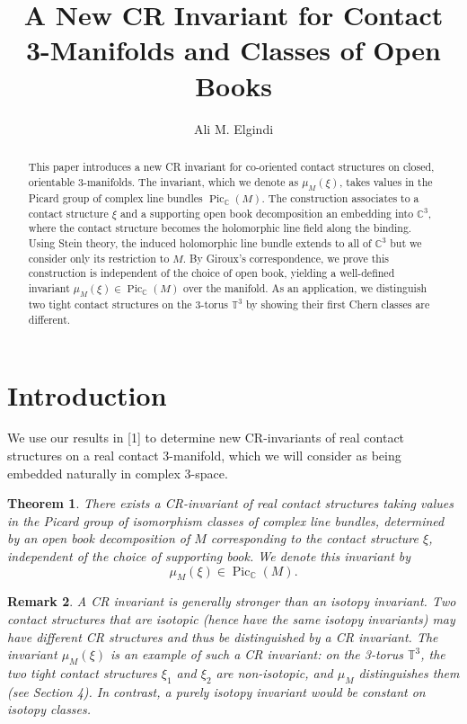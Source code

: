 \documentclass{amsart}
\newtheorem{theorem}{Theorem}
\newtheorem{remark}[theorem]{Remark}
\newcommand{\C}{\mathbb{C}}
\newcommand{\T}{\mathbb{T}}
\newcommand{\Pic}{\operatorname{Pic}}
\begin{document}
\title{A New CR Invariant for Contact 3-Manifolds and Classes of Open Books}
\author{Ali M. Elgindi}
\address{Henan Academy of Sciences}

\maketitle

\begin{abstract}
This paper introduces a new CR invariant for co-oriented contact structures on closed, orientable 3-manifolds. The invariant, which we denote as $\mu_M(\xi)$, takes values in the Picard group of complex line bundles $\Pic_{\C}(M)$. The construction associates to a contact structure $\xi$ and a supporting open book decomposition an embedding into $\C^3$, where the contact structure becomes the holomorphic line field along the binding. Using Stein theory, the induced holomorphic line bundle extends to all of $\C^3$ but we consider only its restriction to $M$. By Giroux's correspondence, we prove this construction is independent of the choice of open book, yielding a well-defined invariant $\mu_M(\xi) \in \Pic_{\C}(M)$ over the manifold. As an application, we distinguish two tight contact structures on the 3-torus $\T^3$ by showing their first Chern classes are different.
\end{abstract}


\section{Introduction}

We use our results in [1] to determine new CR-invariants of real contact structures on a real contact 3-manifold, which we will consider as being embedded naturally in complex 3-space.

\begin{theorem}
There exists a CR-invariant of real contact structures taking values in the Picard group of isomorphism classes of complex line bundles, determined by an open book decomposition of $M$ corresponding to the contact structure $\xi$, independent of the choice of supporting book. We denote this invariant by
\[
\mu_M(\xi) \in \Pic_{\C}(M).
\]
\end{theorem}

\begin{remark}
A CR invariant is generally stronger than an isotopy invariant. Two contact structures that are isotopic (hence have the same isotopy invariants) may have different CR structures and thus be distinguished by a CR invariant. The invariant $\mu_M(\xi)$ is an example of such a CR invariant: on the 3-torus $\T^3$, the two tight contact structures $\xi_1$ and $\xi_2$ are non-isotopic, and $\mu_M$ distinguishes them (see Section 4). In contrast, a purely isotopy invariant would be constant on isotopy classes.
\end{remark}
\end{document}
